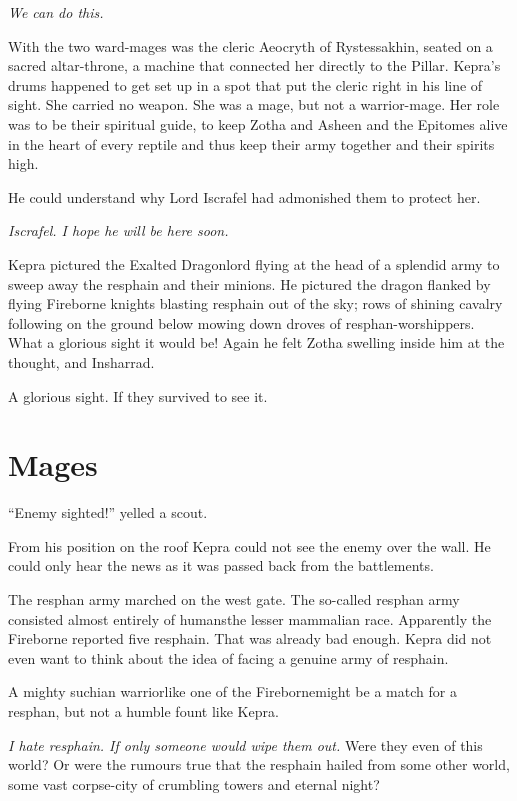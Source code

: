 \documentclass
  [a4paper,
   12pt,
   oneside
  ]%
  {article}
\begin{document}
\emph{We can do this.}

With the two ward-mages was the cleric Aeocryth of Rystessakhin, seated on a sacred altar-throne, a machine that connected her directly to the Pillar. 
Kepra's drums happened to get set up in a spot that put the cleric right in his line of sight. 
She carried no weapon. 
She was a mage, but not a warrior-mage. 
Her role was to be their spiritual guide, to keep Zotha and Asheen and the Epitomes alive in the heart of every reptile and thus keep their army together and their spirits high. 

He could understand why Lord Iscrafel had admonished them to protect her.

\emph{Iscrafel. I hope he will be here soon.} 

Kepra pictured the Exalted Dragonlord flying at the head of a splendid army to sweep away the resphain and their minions. He pictured the dragon flanked by flying Fireborne knights blasting resphain out of the sky; rows of shining cavalry following on the ground below mowing down droves of resphan-worshippers. 
What a glorious sight it would be! Again he felt Zotha swelling inside him at the thought, and Insharrad. 

A glorious sight. If they survived to see it.



\section{Mages}
``Enemy sighted!'' yelled a scout.

From his position on the roof Kepra could not see the enemy over the wall. He could only hear the news as it was passed back from the battlements. 

The resphan army marched on the west gate. 
The so-called resphan army consisted almost entirely of humans\dash{}the lesser mammalian race. 
Apparently the Fireborne reported five resphain. That was already bad enough. Kepra did not even want to think about the idea of facing a genuine army of resphain. 

A mighty suchian warrior\dash{}like one of the Fireborne\dash{}might be a match for a resphan, but not a humble fount like Kepra. 

\emph{I hate resphain. If only someone would wipe them out.} 
Were they even of this world? Or were the rumours true that the resphain hailed from some other world, some vast corpse-city of crumbling towers and eternal night?
\end{document}
